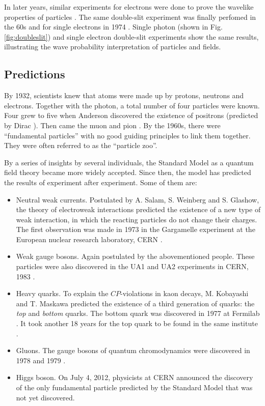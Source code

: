 In later years, similar experiments for electrons were done to prove the wavelike properties of particles \cite{Davisson:1927ta,thomson:1927}. The same double-slit experiment was finally perfomed in the 60s \cite{Jonsson1961} and for single electrons in 1974 \cite{merli:1974}. Single photon \cite{weiswynands:2003} (shown in Fig. \ref{fig:doubleslit}) and single electron double-slit experiments show the same results, illustrating the wave probability interpretation of particles and fields.
\fi

\subsection{Predictions}
By 1932, scientists knew that atoms were made up by protons, neutrons and electrons. Together with the photon, a total number of four particles were known. Four grew to five when Anderson discovered the existence of positrons \cite{Anderson:1933mb} (predicted by Dirac \cite{Dirac:1928hu}). Then came the muon \cite{Neddermeyer:1937md} and pion \cite{Lattes:1947mw}. By the 1960s, there were ``fundamental particles'' with no good guiding principles to link them together. They were often referred to as the ``particle zoo''.

By a series of insights by several individuals, the Standard Model as a quantum field theory became more widely accepted. Since then, the model has predicted the results of experiment after experiment. Some of them are:

\begin{itemize}
\item Neutral weak currents. Postulated by A. Salam, S. Weinberg and S. Glashow, the theory of electroweak interactions predicted the existence of a new type of weak interaction, in which the reacting particles do not change their charges. The first observation was made in 1973 in the Gargamelle experiment at the European nuclear research laboratory, CERN \cite{Hasert:1973ff}.
\item Weak gauge bosons. Again postulated by the abovementioned people. These particles were also discovered in the UA1 and UA2 experiments in CERN, 1983 \cite{Arnison:1983rp,Arnison:1983mk}.
\item Heavy quarks. To explain the $CP$-violations in kaon decays, M. Kobayashi and T. Maskawa predicted the existence of a third generation of quarks: the \textit{top} and \textit{bottom} quarks. The bottom quark was discovered in 1977 at Fermilab \cite{Herb:1977ek}. It took another 18 years for the top quark to be found in the same institute \cite{Abe:1995hr}. 
\item Gluons. The gauge bosons of quantum chromodynamics were discovered in 1978 and 1979 \cite{Barber:1979yr}.
\item Higgs boson. On July 4, 2012, physicists at CERN announced the discovery of the only fundamental particle predicted by the Standard Model that was not yet discovered. 
\end{itemize}  
